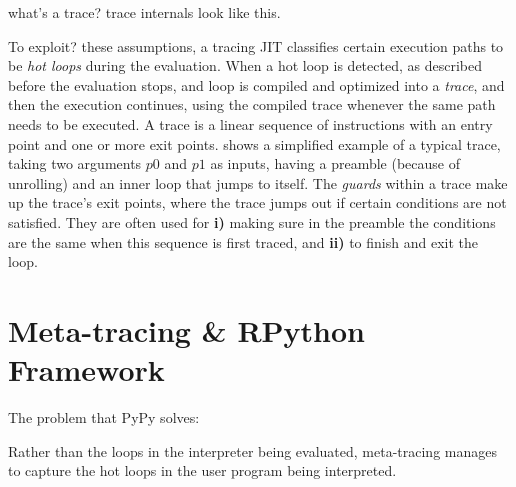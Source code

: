     \begin{paragraph-here}
        what's a trace? trace internals look like this.

        To exploit? these assumptions, a tracing JIT classifies certain
        execution paths to be \emph{hot loops} during the evaluation. When a
        hot loop is detected, as described before the evaluation stops, and
        loop is compiled and optimized into a \emph{trace}, and then the
        execution continues, using the compiled trace whenever the same path
        needs to be executed. A trace is a linear sequence of instructions
        with an entry point and one or more exit points. 
        shows a simplified example of a typical trace, taking two arguments
        $p0$ and $p1$ as inputs, having a preamble (because of unrolling) and
        an inner loop that jumps to itself. The \emph{guards} within a trace
        make up the trace's exit points, where the trace jumps out if certain
        conditions are not satisfied. They are often used for \textbf{i)}
        making sure in the preamble the conditions are the same when this
        sequence is first traced, and \textbf{ii)} to finish and exit the
        loop.
    \end{paragraph-here}





    \section{Meta-tracing \& RPython Framework}
        \begin{mainpoint}
            The problem that PyPy solves:

            Rather than the loops in the interpreter being evaluated, meta-tracing manages to capture the hot loops in the user program being interpreted.
        \end{mainpoint}

